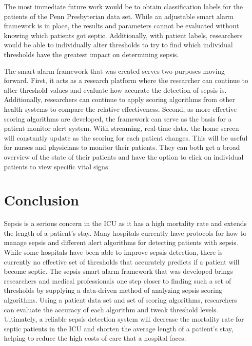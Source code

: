 \documentclass{sig-alternate}
\begin{document}
The most immediate future work would be to obtain classification labels for the patients of the Penn Presbyterian data set.  While an adjustable smart alarm framework is in place, the results and parameters cannot be evaluated without knowing which patients got septic.  Additionally, with patient labels, researchers would be able to individually alter thresholds to try to find which individual thresholds have the greatest impact on determining sepsis.  

The smart alarm framework that was created serves two purposes moving forward.  First, it acts as a research platform where the researcher can continue to alter threshold values and evaluate how accurate the detection of sepsis is.  Additionally, researchers can continue to apply scoring algorithms from other health systems to compare the relative effectiveness.  Second, as more effective scoring algorithms are developed, the framework can serve as the basis for a patient monitor alert system.  With streaming, real-time data, the home screen will constantly update as the scoring for each patient changes.  This will be useful for nurses and physicians to monitor their patients.  They can both get a broad overview of the state of their patients and have the option to click on individual patients to view specific vital signs.

\vspace{10pt}
\section{Conclusion}
\vspace{10pt}
\label{sec:conclusion}

Sepsis is a serious concern in the ICU as it has a high mortality rate and extends the length of a patient's stay.  Many hospitals currently have protocols for how to manage sepsis and different alert algorithms for detecting patients with sepsis.  While some hospitals have been able to improve sepsis detection, there is currently no effective set of thresholds that accurately predicts if a patient will become septic.  The sepsis smart alarm framework that was developed brings researchers and medical professionals one step closer to finding such a set of thresholds by supplying a data-driven method of analyzing sepsis scoring algorithms.  Using a patient data set and set of scoring algorithms, researchers can evaluate the accuracy of each algorithm and tweak threshold levels.  Ultimately, a reliable sepsis detection system will decrease the mortality rate for septic patients in the ICU and shorten the average length of a patient's stay, helping to reduce the high costs of care that a hospital faces.
\end{document}
